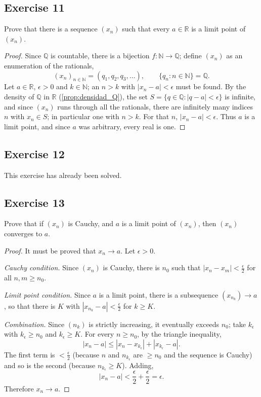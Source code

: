 \documentclass[11pt, a4paper]{article}
\begin{document}
\subsection*{Exercise 11}

Prove that there is a sequence $(x_n)$ such that every $a \in \mathbb{R}$ is a limit point of $(x_n)$.

\begin{proof}
Since $\mathbb{Q}$ is countable, there is a bijection $f: \mathbb{N} \to \mathbb{Q}$; define
$(x_n)$ as an enumeration of the rationals,
$$ (x_n)_{n \in \mathbb{N}} = (q_1, q_2, q_3, \dots), \qquad \{q_n : n \in \mathbb{N}\} = \mathbb{Q}. $$
Let $a \in \mathbb{R}$, $\epsilon > 0$ and $k \in \mathbb{N}$; an $n > k$ with
$|x_n - a| < \epsilon$ must be found. By the density of $\mathbb{Q}$ in $\mathbb{R}$ (\ref{prop:densidad_Q}), the set
$S = \{ q \in \mathbb{Q} : |q - a| < \epsilon \}$ is infinite, and since $(x_n)$ runs through all the
rationals, there are infinitely many indices $n$ with $x_n \in S$; in particular one with $n > k$. For that
$n$, $|x_n - a| < \epsilon$. Thus $a$ is a limit point, and since $a$ was arbitrary, every real is one.
\end{proof}

\subsection*{Exercise 12}

This exercise has already been solved.

\subsection*{Exercise 13}

Prove that if $(x_{n})$ is Cauchy, and $a$ is a limit point of $(x_{n})$, then $(x_{n})$
converges to $a$.

\begin{proof}
It must be proved that $x_n \to a$. Let $\epsilon > 0$.

\textit{Cauchy condition.} Since $(x_n)$ is Cauchy, there is $n_0$ such that
$|x_n - x_m| < \frac{\epsilon}{2}$ for all $n, m \ge n_0$.

\textit{Limit point condition.} Since $a$ is a limit point, there is a subsequence
$(x_{n_k}) \to a$, so that there is $K$ with $|x_{n_k} - a| < \frac{\epsilon}{2}$ for $k \ge K$.

\textit{Combination.} Since $(n_k)$ is strictly increasing, it eventually exceeds $n_0$; take
$k_{\epsilon}$ with $k_{\epsilon} \ge n_0$ and $k_{\epsilon} \ge K$. For every $n \ge n_0$, by the
triangle inequality,
$$ |x_n - a| \le |x_n - x_{k_{\epsilon}}| + |x_{k_{\epsilon}} - a|. $$
The first term is $< \frac{\epsilon}{2}$ (because $n$ and $n_{k_{\epsilon}}$ are $\ge n_0$ and the
sequence is Cauchy) and so is the second (because $n_{k_{\epsilon}} \ge K$). Adding,
$$ |x_n - a| < \frac{\epsilon}{2} + \frac{\epsilon}{2} = \epsilon. $$
Therefore $x_n \to a$.
\end{proof}
\end{document}
